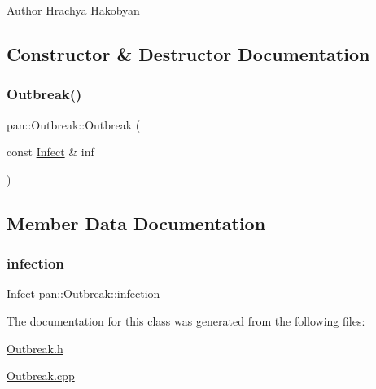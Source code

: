 \begin{DoxyAuthor}{Author}
Hrachya Hakobyan 
\end{DoxyAuthor}


\subsection{Constructor \& Destructor Documentation}
\mbox{\label{classpan_1_1_outbreak_aade590b33f30c7f43f5bb1707234538e}} 
\subsubsection{\texorpdfstring{Outbreak()}{Outbreak()}}
{\footnotesize\ttfamily pan\+::\+Outbreak\+::\+Outbreak (\begin{DoxyParamCaption}\item[{const \hyperlink{classpan_1_1_infect}{Infect} \&}]{inf }\end{DoxyParamCaption})}



\subsection{Member Data Documentation}
\mbox{\label{classpan_1_1_outbreak_a5022e716ec1b51ad1ed9e19a566afdb3}} 
\subsubsection{\texorpdfstring{infection}{infection}}
{\footnotesize\ttfamily \hyperlink{classpan_1_1_infect}{Infect} pan\+::\+Outbreak\+::infection}



The documentation for this class was generated from the following files\+:\begin{DoxyCompactItemize}
\item 
\hyperlink{_outbreak_8h}{Outbreak.\+h}\item 
\hyperlink{_outbreak_8cpp}{Outbreak.\+cpp}\end{DoxyCompactItemize}
